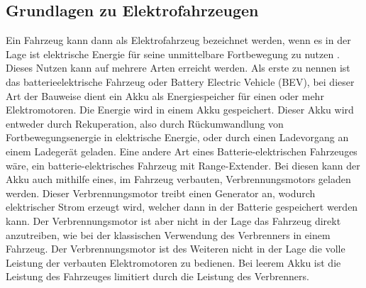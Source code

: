 \subsection{Grundlagen zu Elektrofahrzeugen}
Ein Fahrzeug kann dann als Elektrofahrzeug bezeichnet werden, wenn es in der Lage ist elektrische Energie für seine unmittelbare Fortbewegung zu nutzen \cite{e_auto}. Dieses Nutzen kann auf mehrere Arten erreicht werden. Als erste zu nennen ist das batterieelektrische Fahrzeug oder Battery Electric Vehicle (BEV)\cite{e_auto}, bei dieser Art der Bauweise dient ein Akku als Energiespeicher für einen oder mehr Elektromotoren. Die Energie wird in einem Akku gespeichert. Dieser Akku wird entweder durch Rekuperation, also durch Rückumwandlung von Fortbewegungsenergie in elektrische Energie, oder durch einen Ladevorgang an einem Ladegerät geladen. Eine andere Art eines Batterie-elektrischen Fahrzeuges wäre, ein batterie-elektrisches Fahrzeug mit Range-Extender\cite{e_auto}. Bei diesen kann der Akku auch mithilfe eines, im Fahrzeug verbauten, Verbrennungsmotors geladen werden. Dieser Verbrennungsmotor treibt einen Generator an, wodurch elektrischer Strom erzeugt wird, welcher dann in der Batterie gespeichert werden kann. Der Verbrennungsmotor ist aber nicht in der Lage das Fahrzeug direkt anzutreiben, wie bei der klassischen Verwendung des Verbrenners in einem Fahrzeug. Der Verbrennungsmotor ist des Weiteren nicht in der Lage die volle Leistung der verbauten Elektromotoren zu bedienen. Bei leerem Akku ist die Leistung des Fahrzeuges limitiert durch die Leistung des Verbrenners. \\
